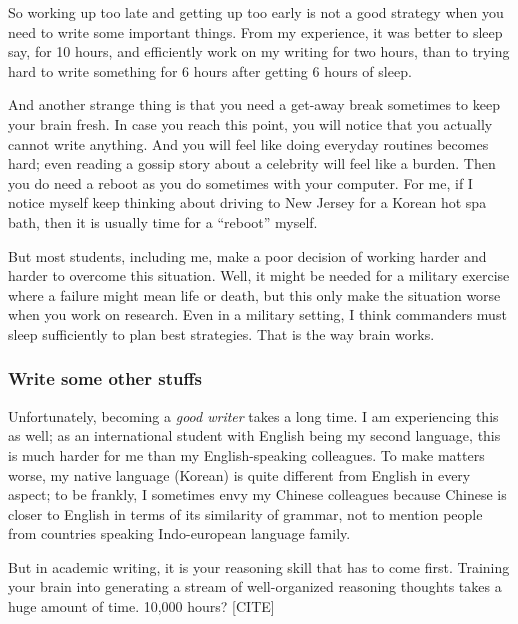 \documentclass[11pt]{article}
\begin{document}
So working up too late and getting up too early is not a good strategy when
you need to write some important things. From my experience, it was better to
sleep say, for 10 hours, and efficiently work on my writing for two hours,
than to trying hard to write something for 6 hours after getting 6 hours of
sleep. 

And another strange thing is that you need a get-away break sometimes to keep
your brain fresh. In case you reach this point, you will notice that you
actually cannot write anything. And you will feel like doing everyday routines
becomes hard; even reading a gossip story about a celebrity will feel like a
burden. Then you do need a reboot as you do sometimes with your computer.  For
me, if I notice myself keep thinking about driving to New Jersey for a Korean
hot spa bath, then it is usually time for a ``reboot'' myself. 

But most students, including me, make a poor decision of working harder and
harder to overcome this situation. Well, it might be needed for a military
exercise where a failure might mean life or death, but this only make the
situation worse when you work on research. Even in a military setting, I think
commanders must sleep sufficiently to plan best strategies. That is the way
brain works. 


\subsubsection{Write some other stuffs}


Unfortunately, becoming a \emph{good writer} takes a long time. I am
experiencing this as well; as an international student with English being my
second language, this is much harder for me than my English-speaking
colleagues.  To make matters worse, my native language (Korean) is quite
different from English in every aspect; to be frankly, I sometimes envy my
Chinese colleagues because Chinese is closer to English in terms of its
similarity of grammar, not to mention people from countries speaking
Indo-european language family.

But in academic writing, it is your reasoning skill that has to come first.
Training your brain into generating a stream of well-organized reasoning
thoughts takes a huge amount of time. 10,000 hours? [CITE]
\end{document}
